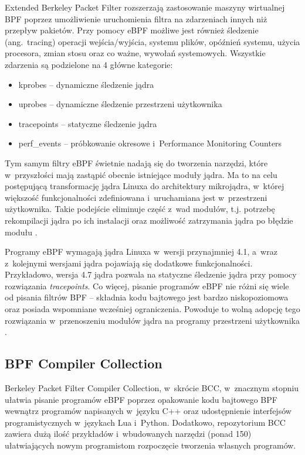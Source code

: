 Extended Berkeley Packet Filter rozszerzają zastosowanie maszyny wirtualnej BPF poprzez umożliwienie uruchomienia filtra na zdarzeniach innych niż przepływ pakietów. Przy pomocy eBPF możliwe jest również śledzenie (ang.~tracing) operacji wejścia/wyjścia, systemu plików, opóźnień systemu, użycia procesora, zmian stosu oraz co ważne, wywołań systemowych. Wszystkie zdarzenia są podzielone na 4 główne kategorie:
\begin{itemize}
    \item kprobes -- dynamiczne śledzenie jądra
    \item uprobes -- dynamiczne śledzenie przestrzeni użytkownika
    \item tracepoints -- statyczne śledzenie jądra
    \item perf\_events -- próbkowanie okresowe i~Performance Monitoring Counters
\end{itemize}
Tym samym filtry eBPF świetnie nadają się do tworzenia narzędzi, które w~przyszłości mają zastąpić obecnie istniejące moduły jądra. Ma to na celu postępującą transformację jądra Linuxa do architektury mikrojądra, w~której większość funkcjonalności zdefiniowana i~uruchamiana jest w~przestrzeni użytkownika. Takie podejście eliminuje część z~wad modułów, t.j. potrzebę rekompilacji jądra po ich instalacji oraz możliwość zatrzymania jądra po błędzie modułu \cite{GreggEBPF}.

Programy eBPF wymagają jądra Linuxa w~wersji przynajmniej 4.1, a~wraz z~kolejnymi wersjami jądra pojawiają się dodatkowe funkcjonalności. Przykładowo, wersja 4.7 jądra pozwala na statyczne śledzenie jądra przy pomocy rozwiązania \textit{tracepoints}. Co więcej, pisanie programów eBPF nie różni się wiele od pisania filtrów BPF -- składnia kodu bajtowego jest bardzo niskopoziomowa oraz posiada wspomniane wcześniej ograniczenia. Powoduje to wolną adopcję tego rozwiązania w~przenoszeniu modułów jądra na programy przestrzeni użytkownika \cite{JacksonEBPF}.

\subsection{BPF Compiler Collection}

Berkeley Packet Filter Compiler Collection, w~skrócie BCC, w~znacznym stopniu ułatwia pisanie programów eBPF poprzez opakowanie kodu bajtowego BPF wewnątrz programów napisanych w~języku C++ oraz udostępnienie interfejsów programistycznych w~językach Lua i~Python. Dodatkowo, repozytorium BCC zawiera dużą ilość przykładów i~wbudowanych narzędzi (ponad 150) ułatwiających nowym programistom rozpoczęcie tworzenia własnych programów.

